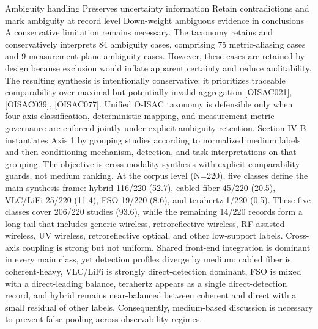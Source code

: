 {}\markdownRendererPipe{} Ambiguity handling \markdownRendererPipe{} Preserves uncertainty information \markdownRendererPipe{} Retain contradictions and mark ambiguity at record level \markdownRendererPipe{} Down-weight ambiguous evidence in conclusions \markdownRendererPipe{}\markdownRendererParagraphSeparator
{}A conservative limitation remains necessary. The taxonomy retains and conservatively interprets 84 ambiguity cases, comprising 75 metric-aliasing cases and 9 measurement-plane ambiguity cases. However, these cases are retained by design because exclusion would inflate apparent certainty and reduce auditability. The resulting synthesis is intentionally conservative: it prioritizes traceable comparability over maximal but potentially invalid aggregation [O\markdownRendererUnderscore{}ISAC\markdownRendererUnderscore{}021], [O\markdownRendererUnderscore{}ISAC\markdownRendererUnderscore{}039], [O\markdownRendererUnderscore{}ISAC\markdownRendererUnderscore{}077].\markdownRendererParagraphSeparator
{} Unified O-ISAC taxonomy is defensible only when four-axis classification, deterministic mapping, and measurement-metric governance are enforced jointly under explicit ambiguity retention.\markdownRendererInterblockSeparator
{}\markdownRendererThematicBreak{}\markdownRendererInterblockSeparator
{}
\markdownRendererSectionEnd 
\markdownRendererSectionEnd \markdownRendererSectionBegin
{}\markdownRendererInterblockSeparator
{}Section IV-B instantiates Axis 1 by grouping studies according to normalized medium labels and then conditioning mechanism, detection, and task interpretations on that grouping. The objective is cross-modality synthesis with explicit comparability guards, not medium ranking. At the corpus level (N=220), five classes define the main synthesis frame: hybrid 116/220 (52.7\markdownRendererPercentSign{}), cabled fiber 45/220 (20.5\markdownRendererPercentSign{}), VLC/LiFi 25/220 (11.4\markdownRendererPercentSign{}), FSO 19/220 (8.6\markdownRendererPercentSign{}), and terahertz 1/220 (0.5\markdownRendererPercentSign{}). These five classes cover 206/220 studies (93.6\markdownRendererPercentSign{}), while the remaining 14/220 records form a long tail that includes generic wireless, retroreflective wireless, RF-assisted wireless, UV wireless, retroreflective optical, and other low-support labels.\markdownRendererParagraphSeparator
{}Cross-axis coupling is strong but not uniform. Shared front-end integration is dominant in every main class, yet detection profiles diverge by medium: cabled fiber is coherent-heavy, VLC/LiFi is strongly direct-detection dominant, FSO is mixed with a direct-leading balance, terahertz appears as a single direct-detection record, and hybrid remains near-balanced between coherent and direct with a small residual of other labels. Consequently, medium-based discussion is necessary to prevent false pooling across observability regimes.\markdownRendererParagraphSeparator
